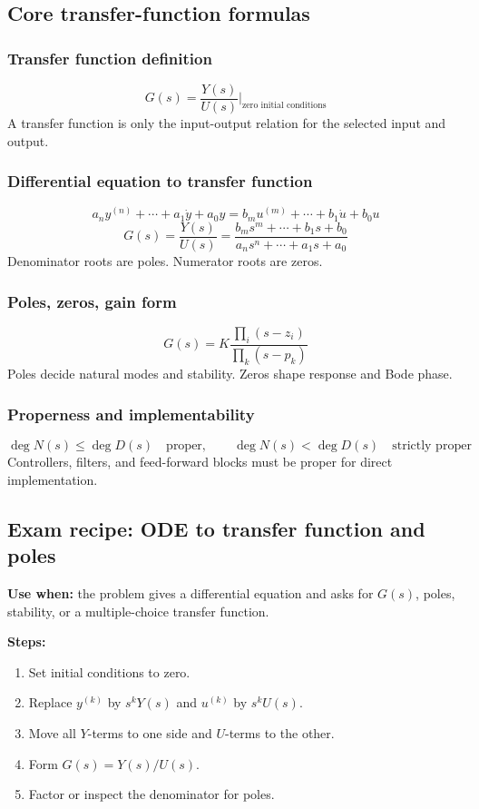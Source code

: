 \subsection{Core transfer-function formulas}

\subsubsection{Transfer function definition}
\[
G(s)=\frac{Y(s)}{U(s)}\bigg|_{\text{zero initial conditions}}
\]
A transfer function is only the input-output relation for the selected input and output.

\subsubsection{Differential equation to transfer function}
\[
a_n y^{(n)}+\cdots+a_1\dot{y}+a_0y
=b_m u^{(m)}+\cdots+b_1\dot{u}+b_0u
\]
\[
G(s)=\frac{Y(s)}{U(s)}
=\frac{b_ms^m+\cdots+b_1s+b_0}{a_ns^n+\cdots+a_1s+a_0}
\]
Denominator roots are poles. Numerator roots are zeros.

\subsubsection{Poles, zeros, gain form}
\[
G(s)=K\frac{\prod_i(s-z_i)}{\prod_k(s-p_k)}
\]
Poles decide natural modes and stability. Zeros shape response and Bode phase.

\subsubsection{Properness and implementability}
\[
\deg N(s)\leq \deg D(s)\quad\text{proper},\qquad
\deg N(s)<\deg D(s)\quad\text{strictly proper}
\]
Controllers, filters, and feed-forward blocks must be proper for direct implementation.

\subsection{Exam recipe: ODE to transfer function and poles}

\textbf{Use when:} the problem gives a differential equation and asks for \(G(s)\), poles, stability, or a multiple-choice transfer function.

\textbf{Steps:}
\begin{enumerate}
\item Set initial conditions to zero.
\item Replace \(y^{(k)}\) by \(s^kY(s)\) and \(u^{(k)}\) by \(s^kU(s)\).
\item Move all \(Y\)-terms to one side and \(U\)-terms to the other.
\item Form \(G(s)=Y(s)/U(s)\).
\item Factor or inspect the denominator for poles.
\end{enumerate}

